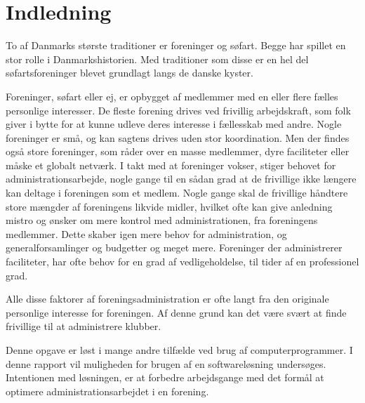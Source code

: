\chapter{Indledning}


To af Danmarks største traditioner er foreninger og søfart. Begge har spillet en stor rolle i Danmarkshistorien. Med traditioner som disse er en hel del søfartsforeninger blevet grundlagt langs de danske kyster. 

Foreninger, søfart eller ej, er opbygget af medlemmer med en eller flere fælles personlige interesser. De fleste forening drives ved frivillig arbejdskraft, som folk giver i bytte for at kunne udleve deres interesse i fællesskab med andre. Nogle foreninger er små, og kan sagtens drives uden stor koordination. Men der findes også store foreninger, som råder over en masse medlemmer, dyre faciliteter eller måske et globalt netværk. I takt med at foreninger vokser, stiger behovet for administrationsarbejde, nogle gange til en sådan grad at de frivillige ikke længere kan deltage i foreningen som et medlem. Nogle gange skal de frivillige håndtere store mængder af foreningens likvide midler, hvilket ofte kan give anledning mistro og ønsker om mere kontrol med administrationen, fra foreningens medlemmer. Dette skaber igen mere behov for administration, og generalforsamlinger og budgetter og meget mere. Foreninger der administrerer faciliteter, har ofte behov for en grad af vedligeholdelse, til tider af en professionel grad. 

Alle disse faktorer af foreningsadministration er ofte langt fra den originale personlige interesse for foreningen. Af denne grund kan det være svært at finde frivillige til at administrere klubber.



Denne opgave er løst i mange andre tilfælde ved brug af computerprogrammer. I denne rapport vil muligheden for brugen af en softwareløsning undersøges. Intentionen med løsningen, er at forbedre arbejdsgange med det formål at optimere administrationsarbejdet i en forening.


